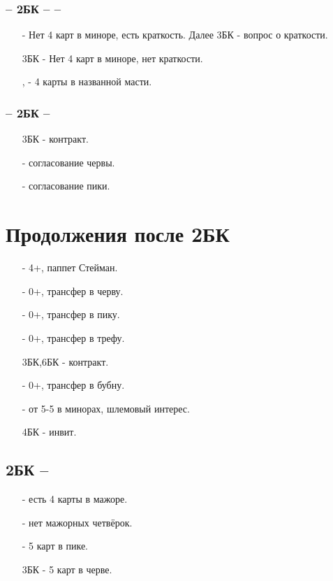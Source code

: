 \documentclass{article}
\begin{document}
\subsubsection{ -- 2БК --  -- }
\begin{enumerate}
    \item[\sp{3}] - Нет 4 карт в миноре, есть краткость. Далее 3БК - вопрос о краткости.
    \item[3БК] - Нет 4 карт в миноре, нет краткости.
    \item[\cl{4}, \di{4}] - 4 карты в названной масти.
\end{enumerate}
\subsubsection{ -- 2БК -- }
\begin{enumerate}
    \item[3БК] - контракт.
    \item[\cl{4}] - согласование червы.
    \item[\di{4}] - согласование пики.
\end{enumerate}
\section{Продолжения после 2БК}
\begin{enumerate}
    \item[\cl{3}] - 4+, паппет Стейман.
    \item[\di{3}] - 0+, трансфер в черву.
    \item[\he{3}] - 0+, трансфер в пику.
    \item[\sp{3}] - 0+, трансфер в трефу.
    \item[3БК,6БК] - контракт.
    \item[\cl{4}] - 0+, трансфер в бубну.
    \item[\sp{4}] - от 5-5 в минорах, шлемовый интерес.
    \item[4БК] - инвит.
\end{enumerate}
\subsection{2БК -- }
\begin{enumerate}
    \item[\di{3}] - есть 4 карты в мажоре.
    \item[\he{3}] - нет мажорных четвёрок.
    \item[\sp{3}] - 5 карт в пике.
    \item[3БК] - 5 карт в черве. 
\end{enumerate}
\end{document}
